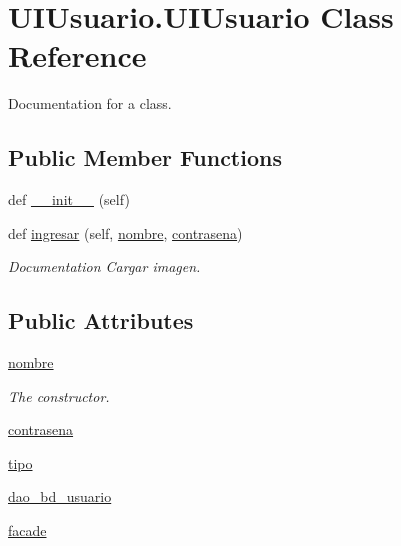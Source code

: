 \hypertarget{class_u_i_usuario_1_1_u_i_usuario}{}\section{U\+I\+Usuario.\+U\+I\+Usuario Class Reference}
\label{class_u_i_usuario_1_1_u_i_usuario}


Documentation for a class.  


\subsection*{Public Member Functions}
\begin{DoxyCompactItemize}
\item 
def \mbox{\hyperlink{class_u_i_usuario_1_1_u_i_usuario_a1e65f56af297fce4d5b3ed7613f1d0fa}{\+\_\+\+\_\+init\+\_\+\+\_\+}} (self)
\item 
def \mbox{\hyperlink{class_u_i_usuario_1_1_u_i_usuario_ad83e1ef18f57b281a7708fd8ef0d3da4}{ingresar}} (self, \mbox{\hyperlink{class_u_i_usuario_1_1_u_i_usuario_a0a907891ebfe5679bbab53bf18e03b32}{nombre}}, \mbox{\hyperlink{class_u_i_usuario_1_1_u_i_usuario_a9763b58970d5e168cc76be6fc8560bef}{contrasena}})
\begin{DoxyCompactList}\small\item\em Documentation Cargar imagen. \end{DoxyCompactList}\end{DoxyCompactItemize}
\subsection*{Public Attributes}
\begin{DoxyCompactItemize}
\item 
\mbox{\hyperlink{class_u_i_usuario_1_1_u_i_usuario_a0a907891ebfe5679bbab53bf18e03b32}{nombre}}
\begin{DoxyCompactList}\small\item\em The constructor. \end{DoxyCompactList}\item 
\mbox{\hyperlink{class_u_i_usuario_1_1_u_i_usuario_a9763b58970d5e168cc76be6fc8560bef}{contrasena}}
\item 
\mbox{\hyperlink{class_u_i_usuario_1_1_u_i_usuario_a8978cc3071fdc4a58afd844f4b25b689}{tipo}}
\item 
\mbox{\hyperlink{class_u_i_usuario_1_1_u_i_usuario_adf50015c7f5cfa3323ce947b4170fb8b}{dao\+\_\+bd\+\_\+usuario}}
\item 
\mbox{\hyperlink{class_u_i_usuario_1_1_u_i_usuario_a03b33bc6d21217abcdbaef28c27c24e9}{facade}}
\end{DoxyCompactItemize}


